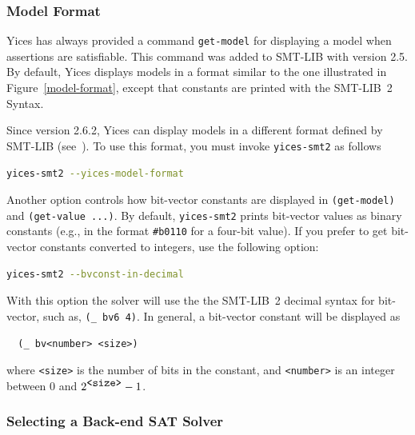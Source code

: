 \documentclass[11pt,twoside,fleqn,openright,titlepage]{cslreport}
\begin{document}
\subsubsection*{Model Format}

Yices has always provided a command \texttt{get-model} for displaying
a model when assertions are satisfiable. This command was added to
SMT-LIB with version 2.5. By default, Yices displays models in a
format similar to the one illustrated in Figure~\ref{model-format},
except that constants are printed with the SMT-LIB~2 Syntax.

\medskip\noindent Since version 2.6.2, Yices can display models
in a different format defined by SMT-LIB (see~\cite{SMTLIB26:2017}).
To use this format, you must invoke \texttt{yices-smt2} as follows
\begin{small}
\begin{lstlisting}[language=sh]
   yices-smt2 --yices-model-format
\end{lstlisting}
\end{small}

\medskip\noindent Another option controls how bit-vector constants are
displayed in \texttt{(get-model)} and \texttt{(get-value ...)}. By
default, \texttt{yices-smt2} prints bit-vector values as binary
constants (e.g., in the format \texttt{\#b0110} for a four-bit value).
If you prefer to get bit-vector constants converted to integers, use
the following option:
\begin{small}
\begin{lstlisting}[language=sh,deletekeywords={in}]
   yices-smt2 --bvconst-in-decimal
\end{lstlisting}
\end{small}
With this option the solver will use the the SMT-LIB~2 decimal syntax
for bit-vector, such as, \verb+(_ bv6 4)+. In general, a
bit-vector constant will be displayed as
\begin{small}
\begin{verbatim}
  (_ bv<number> <size>)
\end{verbatim}
\end{small}
where \texttt{<size>} is the number of bits in the constant, and
\texttt{<number>} is an integer between $0$ and $2^{\mbox{\texttt{<size>}}}-1$.


\subsubsection*{Selecting a Back-end SAT Solver}
\end{document}
